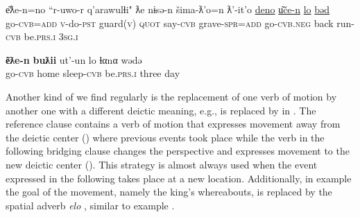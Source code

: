 \documentclass[output=paper]{LSP/langsci}
\begin{document}
\begin{exe}
	\ex	\label{ex:14ab}
	\begin{xlist}
		\ex	\label{ex:14a}
		\gll	e͂ƛe-n=no			``r-uwo-r		q'arawulɬi" 	ƛe			nɨsə-n		šima-ƛ'o=n ƛ'-it'o				\underline{deno}	\underline{u͂če-n}		\underline{lo}			\underline{bəd}\\
			go-\textsc{cvb=add}		\textsc{v}-do-\textsc{pst}		guard(\textsc{v})		\textsc{quot}		say-\textsc{cvb}	grave-\textsc{spr=add} go-\textsc{cvb.neg}		back	run-\textsc{cvb}	be.\textsc{prs.i}	\textsc{3sg.i}\\
		\glt	{}

		\ex	\label{ex:14b}
		\gll	\textbf{e͂ƛe-n}		\textbf{buƛii}		ut'-un			lo				ɬαnα		wədə \\
			go-\textsc{cvb}	home		sleep-\textsc{cvb}	be.\textsc{prs.i}		three		day\\
		\glt	{}
	\end{xlist}
\end{exe}

Another kind of  we find regularly is the replacement of one verb of motion by another one with a different deictic meaning, e.g.,  is replaced by  in . The reference clause contains a verb of motion that expresses movement away from the deictic center () where previous events took place while the verb in the following bridging clause changes the perspective and expresses movement to the new deictic center (). This strategy is almost always used when the event expressed in the following  takes place at a new location. Additionally, in example  the goal of the movement, namely the king's whereabouts, is replaced by the spatial adverb \textit{elo} , similar to example .
\end{document}
